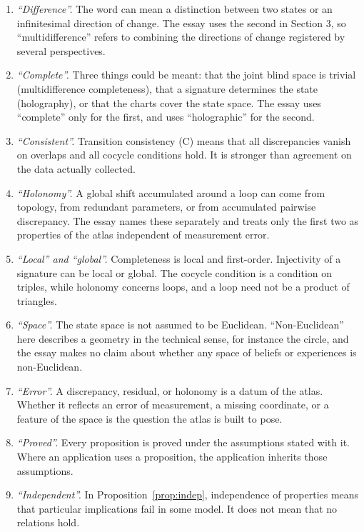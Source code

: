 \documentclass[11pt]{article}
\theoremstyle{remark}
\begin{document}
\begin{enumerate}[label=(\alph*),nosep]
\item \emph{``Difference''.} The word can mean a distinction between two states or an infinitesimal direction of change. The essay uses the second in Section 3, so ``multidifference'' refers to combining the directions of change registered by several perspectives.
\item \emph{``Complete''.} Three things could be meant: that the joint blind space is trivial (multidifference completeness), that a signature determines the state (holography), or that the charts cover the state space. The essay uses ``complete'' only for the first, and uses ``holographic'' for the second.
\item \emph{``Consistent''.} Transition consistency (C) means that all discrepancies vanish on overlaps and all cocycle conditions hold. It is stronger than agreement on the data actually collected.
\item \emph{``Holonomy''.} A global shift accumulated around a loop can come from topology, from redundant parameters, or from accumulated pairwise discrepancy. The essay names these separately and treats only the first two as properties of the atlas independent of measurement error.
\item \emph{``Local'' and ``global''.} Completeness is local and first-order. Injectivity of a signature can be local or global. The cocycle condition is a condition on triples, while holonomy concerns loops, and a loop need not be a product of triangles.
\item \emph{``Space''.} The state space is not assumed to be Euclidean. ``Non-Euclidean'' here describes a geometry in the technical sense, for instance the circle, and the essay makes no claim about whether any space of beliefs or experiences is non-Euclidean.
\item \emph{``Error''.} A discrepancy, residual, or holonomy is a datum of the atlas. Whether it reflects an error of measurement, a missing coordinate, or a feature of the space is the question the atlas is built to pose.
\item \emph{``Proved''.} Every proposition is proved under the assumptions stated with it. Where an application uses a proposition, the application inherits those assumptions.
\item \emph{``Independent''.} In Proposition~\ref{prop:indep}, independence of properties means that particular implications fail in some model. It does not mean that no relations hold.
\end{enumerate}
\end{document}
